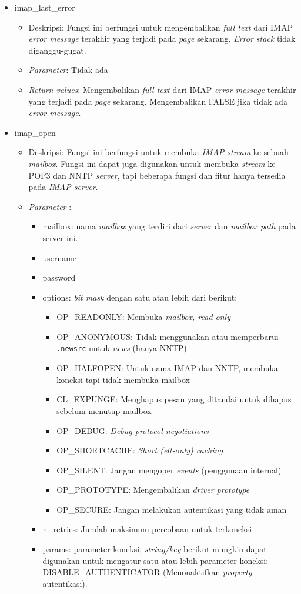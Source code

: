\begin{itemize}
\item imap\_last\_error
\begin{itemize}
\item Deskripsi: Fungsi ini berfungsi untuk mengembalikan \textit{full text} dari IMAP \textit{error message} terakhir yang terjadi pada \textit{page} sekarang. \textit{Error stack} tidak diganggu-gugat.
\item \textit{Parameter}: Tidak ada
\item \textit{Return values}: Mengembalikan \textit{full text} dari IMAP \textit{error message} terakhir yang terjadi pada \textit{page} sekarang. Mengembalikan FALSE jika tidak ada \textit{error message}.
\end{itemize}
 
\item imap\_open
\begin{itemize}
\item Deskripsi: Fungsi ini berfungsi untuk membuka \textit{IMAP stream} ke sebuah \textit{mailbox}. Fungsi ini dapat juga digunakan untuk membuka \textit{stream} ke POP3 dan NNTP \textit{server}, tapi beberapa fungsi dan fitur hanya tersedia pada \textit{IMAP server}.
\item \textit{Parameter} :
 \begin{itemize}
 \item mailbox: nama \textit{mailbox} yang terdiri dari \textit{server} dan \textit{mailbox path} pada server ini.
 \item username
 \item password
 \item options: \textit{bit mask} dengan satu atau lebih dari berikut: 
   \begin{itemize}
   \item OP\_READONLY: Membuka \textit{mailbox, read-only}
   \item OP\_ANONYMOUS: Tidak menggunakan atau memperbarui \texttt{.newsrc} untuk \textit{news} (hanya NNTP)
   \item OP\_HALFOPEN: Untuk nama IMAP dan NNTP, membuka koneksi tapi tidak membuka mailbox
   \item CL\_EXPUNGE: Menghapus pesan yang ditandai untuk dihapus sebelum menutup mailbox
   \item OP\_DEBUG: \textit{Debug protocol negotiations}
   \item OP\_SHORTCACHE: \textit{Short (elt-only) caching}
   \item OP\_SILENT: Jangan mengoper \textit{events} (penggunaan internal)
   \item OP\_PROTOTYPE: Mengembalikan \textit{driver prototype}
   \item OP\_SECURE: Jangan melakukan autentikasi yang tidak aman
   \end{itemize}
 \item n\_retries: Jumlah maksimum percobaan untuk terkoneksi
 \item params: parameter koneksi, \textit{string/key} berikut mungkin dapat digunakan untuk mengatur satu atau lebih parameter koneksi: DISABLE\_AUTHENTICATOR (Menonaktifkan \textit{property} autentikasi).


\end{itemize}
\end{itemize}
\end{itemize}
